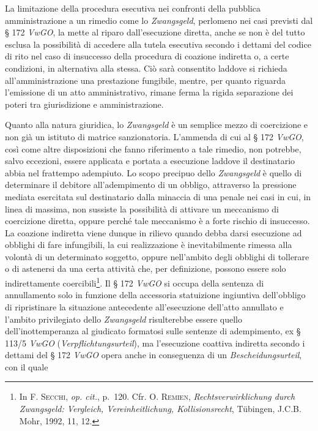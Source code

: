 \documentclass[12pt,it,a4paper,]{report}
\begin{document}
La limitazione della procedura esecutiva nei confronti della pubblica
amministrazione a un rimedio come lo \emph{Zwangsgeld}, perlomeno nei
casi previsti dal § 172 \emph{VwGO}, la mette al riparo dall'esecuzione
diretta, anche se non è del tutto esclusa la possibilità di accedere
alla tutela esecutiva secondo i dettami del codice di rito nel caso di
insuccesso della procedura di coazione indiretta o, a certe condizioni,
in alternativa alla stessa. Ciò sarà consentito laddove si richieda
all'amministrazione una prestazione fungibile, mentre, per quanto
riguarda l'emissione di un atto amministrativo, rimane ferma la rigida
separazione dei poteri tra giurisdizione e amministrazione.

Quanto alla natura giuridica, lo \emph{Zwangsgeld} è un semplice mezzo
di coercizione e non già un istituto di matrice sanzionatoria. L'ammenda
di cui al § 172 \emph{VwGO}, così come altre disposizioni che fanno
riferimento a tale rimedio, non potrebbe, salvo eccezioni, essere
applicata e portata a esecuzione laddove il destinatario abbia nel
frattempo adempiuto. Lo scopo precipuo dello \emph{Zwangsgeld} è quello
di determinare il debitore all'adempimento di un obbligo, attraverso la
pressione mediata esercitata sul destinatario dalla minaccia di una
penale nei casi in cui, in linea di massima, non sussiste la possibilità
di attivare un meccanismo di coercizione diretta, oppure perché tale
meccanismo è a forte rischio di insuccesso. La coazione indiretta viene
dunque in rilievo quando debba darsi esecuzione ad obblighi di fare
infungibili, la cui realizzazione è inevitabilmente rimessa alla volontà
di un determinato soggetto, oppure nell'ambito degli obblighi di
tollerare o di astenersi da una certa attività che, per definizione,
possono essere solo indirettamente coercibili\footnote{In
  \textsc{F. Secchi}, \emph{op. cit.}, p.~120. Cfr. O. \textsc{Remien},
  \emph{Rechtsverwirklichung durch Zwangsgeld: Vergleich,
  Vereinheitlichung, Kollisionsrecht}, Tübingen, J.C.B. Mohr, 1992, 11,
  12.}. Il § 172 \emph{VwGO} si occupa della sentenza di annullamento
solo in funzione della accessoria statuizione ingiuntiva dell'obbligo di
ripristinare la situazione antecedente all'esecuzione dell'atto
annullato e l'ambito privilegiato dello \emph{Zwangsgeld} risulterebbe
essere quello dell'inottemperanza al giudicato formatosi sulle sentenze
di adempimento, ex § 113/5 \emph{VwGO} (\emph{Verpflichtungsurteil}), ma
l'esecuzione coattiva indiretta secondo i dettami del § 172 \emph{VwGO}
opera anche in conseguenza di un \emph{Bescheidungsurteil}, con il quale
\end{document}
